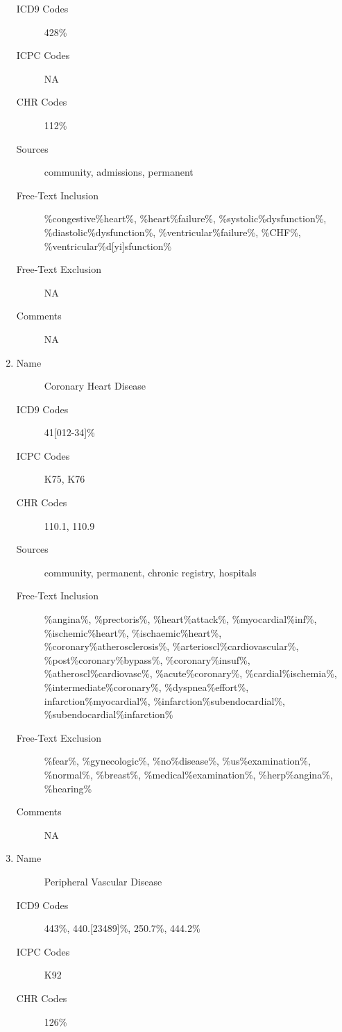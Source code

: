 \documentclass[a4paper,12pt]{article}
\begin{document}
\begin{appendices}
\begin{enumerate}
\begin{description}
   						\item[ICD9 Codes] 428\%
   						\item[ICPC Codes] NA
   						\item[CHR Codes] 112\%
   						\item[Sources] community, admissions, permanent
   						\item[Free-Text Inclusion] \%congestive\%heart\%, \%heart\%failure\%, \%systolic\%dysfunction\%, \%diastolic\%dysfunction\%, \%ventricular\%failure\%, \%CHF\%, \%ventricular\%d[yi]sfunction\%
   						\item[Free-Text Exclusion] NA
   						\item[Comments] NA
   					\end{description}
   					\item
   					\begin{description}
   						\item[Name] Coronary Heart Disease
   						\item[ICD9 Codes] 41[012-34]\%
   						\item[ICPC Codes] K75, K76
   						\item[CHR Codes] 110.1, 110.9
   						\item[Sources] community, permanent, chronic registry, hospitals
   						\item[Free-Text Inclusion] \%angina\%, \%prectoris\%, \%heart\%attack\%, \%myocardial\%inf\%, \%ischemic\%heart\%, \%ischaemic\%heart\%, \%coronary\%atherosclerosis\%, \%arterioscl\%cardiovascular\%, \%post\%coronary\%bypass\%, \%coronary\%insuf\%, \%atheroscl\%cardiovasc\%, \%acute\%coronary\%, \%cardial\%ischemia\%, \%intermediate\%coronary\%, \%dyspnea\%effort\%, infarction\%myocardial\%, \%infarction\%subendocardial\%, \%subendocardial\%infarction\%
   						\item[Free-Text Exclusion] \%fear\%, \%gynecologic\%, \%no\%disease\%, \%us\%examination\%, \%normal\%, \%breast\%, \%medical\%examination\%, \%herp\%angina\%, \%hearing\%
   						\item[Comments] NA
   					\end{description}
   					\item
   					\begin{description}
   						\item[Name] Peripheral Vascular Disease
   						\item[ICD9 Codes] 443\%, 440.[23489]\%, 250.7\%, 444.2\%
   						\item[ICPC Codes] K92
   						\item[CHR Codes] 126\%

\end{description}
\end{enumerate}
\end{appendices}
\end{document}
